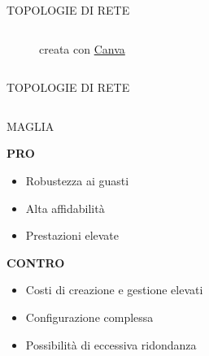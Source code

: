 \documentclass[aspectratio=1610]{beamer}
\begin{document}
\begin{frame}{TOPOLOGIE DI RETE}
\begin{columns}
\begin{figure}
                \caption{{creata con \href{https://www.canva.com/}{Canva}}}
            \end{figure}
    \end{columns}
\end{frame}

\begin{frame}{TOPOLOGIE DI RETE}
    \begin{columns}
            \justifying
            \begin{alertblock}{MAGLIA}
                \begin{minipage}{0.96\linewidth}
                    \justifying
                    \textbf{PRO}
                    \begin{itemize}
                        \item Robustezza ai guasti
                        \pause
                        \item Alta affidabilità
                        \pause
                        \item Prestazioni elevate
                    \end{itemize}
                    \pause
                    \textbf{CONTRO}
                    \begin{itemize}
                        \item Costi di creazione e gestione elevati
                        \pause
                        \item Configurazione complessa
                        \pause
                        \item Possibilità di eccessiva ridondanza
                    \end{itemize}
                \end{minipage}
            \end{alertblock}
            \begin{figure}

\end{figure}
\end{columns}
\end{frame}
\end{document}
